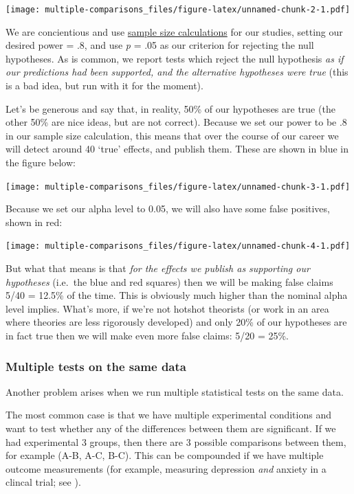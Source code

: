 \documentclass[]{article}
\theoremstyle{definition}
\theoremstyle{definition}
\theoremstyle{definition}
\theoremstyle{remark}
\begin{document}
\texttt{[image: multiple-comparisons\_files/figure-latex/unnamed-chunk-2-1.pdf]}

We are concientious and use \protect\hyperlink{power}{sample size
calculations} for our studies, setting our desired power = .8, and use
\emph{p} = .05 as our criterion for rejecting the null hypotheses. As is
common, we report tests which reject the null hypothesis \emph{as if our
predictions had been supported, and the alternative hypotheses were
true} (this is a bad idea, but run with it for the moment).

Let's be generous and say that, in reality, 50\% of our hypotheses are
true (the other 50\% are nice ideas, but are not correct). Because we
set our power to be .8 in our sample size calculation, this means that
over the course of our career we will detect around 40 `true' effects,
and publish them. These are shown in blue in the figure below:

\texttt{[image: multiple-comparisons\_files/figure-latex/unnamed-chunk-3-1.pdf]}

Because we set our alpha level to 0.05, we will also have some false
positives, shown in red:

\texttt{[image: multiple-comparisons\_files/figure-latex/unnamed-chunk-4-1.pdf]}

But what that means is that \emph{for the effects we publish as
supporting our hypotheses} (i.e.~the blue and red squares) then we will
be making false claims 5/40 = 12.5\% of the time. This is obviously much
higher than the nominal alpha level implies. What's more, if we're not
hotshot theorists (or work in an area where theories are less rigorously
developed) and only 20\% of our hypotheses are in fact true then we will
make even more false claims: 5/20 = 25\%.

\subsubsection*{Multiple tests on the same
data}\label{multiple-tests-on-the-same-data}

Another problem arises when we run multiple statistical tests on the
same data.

The most common case is that we have multiple experimental conditions
and want to test whether any of the differences between them are
significant. If we had experimental 3 groups, then there are 3 possible
comparisons between them, for example (A-B, A-C, B-C). This can be
compounded if we have multiple outcome measurements (for example,
measuring depression \emph{and} anxiety in a clincal trial; see
\citet{feise2002multiple}).
\end{document}
